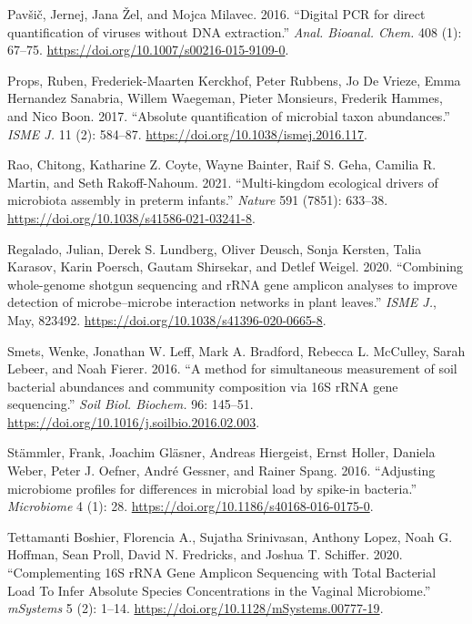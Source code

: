 \documentclass[
]{article}
\newlength{\cslhangindent}
\newlength{\cslentryspacingunit} %
\newenvironment{CSLReferences}[2] %
 {%
  \setlength{\parindent}{0pt}
  \ifodd #1
  \let\oldpar\par
  \def\par{\hangindent=\cslhangindent\oldpar}
  \fi
  \setlength{\parskip}{#2\cslentryspacingunit}
 }%
 {}
\begin{document}
\begin{CSLReferences}{1}{0}
\leavevmode{}%
Pavšič, Jernej, Jana Žel, and Mojca Milavec. 2016. {``{Digital PCR for direct quantification of viruses without DNA extraction}.''} \emph{Anal. Bioanal. Chem.} 408 (1): 67--75. \url{https://doi.org/10.1007/s00216-015-9109-0}.

\leavevmode{}%
Props, Ruben, Frederiek-Maarten Kerckhof, Peter Rubbens, Jo De Vrieze, Emma Hernandez Sanabria, Willem Waegeman, Pieter Monsieurs, Frederik Hammes, and Nico Boon. 2017. {``{Absolute quantification of microbial taxon abundances}.''} \emph{ISME J.} 11 (2): 584--87. \url{https://doi.org/10.1038/ismej.2016.117}.

\leavevmode{}%
Rao, Chitong, Katharine Z. Coyte, Wayne Bainter, Raif S. Geha, Camilia R. Martin, and Seth Rakoff-Nahoum. 2021. {``{Multi-kingdom ecological drivers of microbiota assembly in preterm infants}.''} \emph{Nature} 591 (7851): 633--38. \url{https://doi.org/10.1038/s41586-021-03241-8}.

\leavevmode{}%
Regalado, Julian, Derek S. Lundberg, Oliver Deusch, Sonja Kersten, Talia Karasov, Karin Poersch, Gautam Shirsekar, and Detlef Weigel. 2020. {``{Combining whole-genome shotgun sequencing and rRNA gene amplicon analyses to improve detection of microbe--microbe interaction networks in plant leaves}.''} \emph{ISME J.}, May, 823492. \url{https://doi.org/10.1038/s41396-020-0665-8}.

\leavevmode{}%
Smets, Wenke, Jonathan W. Leff, Mark A. Bradford, Rebecca L. McCulley, Sarah Lebeer, and Noah Fierer. 2016. {``{A method for simultaneous measurement of soil bacterial abundances and community composition via 16S rRNA gene sequencing}.''} \emph{Soil Biol. Biochem.} 96: 145--51. \url{https://doi.org/10.1016/j.soilbio.2016.02.003}.

\leavevmode{}%
Stämmler, Frank, Joachim Gläsner, Andreas Hiergeist, Ernst Holler, Daniela Weber, Peter J. Oefner, André Gessner, and Rainer Spang. 2016. {``{Adjusting microbiome profiles for differences in microbial load by spike-in bacteria}.''} \emph{Microbiome} 4 (1): 28. \url{https://doi.org/10.1186/s40168-016-0175-0}.

\leavevmode{}%
Tettamanti Boshier, Florencia A., Sujatha Srinivasan, Anthony Lopez, Noah G. Hoffman, Sean Proll, David N. Fredricks, and Joshua T. Schiffer. 2020. {``{Complementing 16S rRNA Gene Amplicon Sequencing with Total Bacterial Load To Infer Absolute Species Concentrations in the Vaginal Microbiome}.''} \emph{mSystems} 5 (2): 1--14. \url{https://doi.org/10.1128/mSystems.00777-19}.


\end{CSLReferences}
\end{document}
